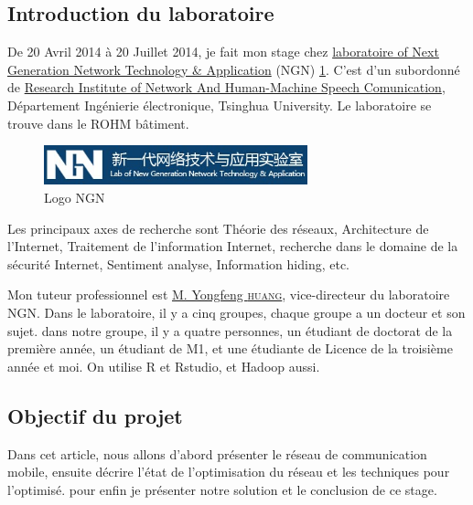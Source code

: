   \subsection{Introduction du laboratoire}
 De 20 Avril 2014 à 20 Juillet 2014, je fait mon stage chez \href{http://203.91.121.76/joomla/}{laboratoire of Next Generation Network Technology \& Application} \textsf{(NGN)} \ref{Logo NGN}. C'est d'un subordonné de \href{http://www.ee.tsinghua.edu.cn/publish/eeen/3776/index.html}{Research Institute of Network And Human-Machine Speech Comunication}, Département Ingénierie électronique, Tsinghua University. Le laboratoire se trouve dans le ROHM bâtiment.
  \begin{figure}[H]
      \centering
      \includegraphics[width=3in]{images/NGN.jpg}
      \caption{Logo NGN}
      \label{Logo NGN}
  \end{figure}
Les principaux axes de recherche sont Théorie des réseaux, Architecture de l'Internet, Traitement de l'information Internet, recherche dans le domaine de la sécurité Internet, Sentiment analyse, Information hiding, etc.

 Mon tuteur professionnel est \href{http://203.91.121.76/joomla/index.php/staff/teacher/83-huangyongfeng}{M. Yongfeng \textsc{huang}}, vice-directeur du laboratoire NGN. Dans le laboratoire, il y a cinq groupes, chaque groupe a un docteur et son sujet. dans notre groupe, il y a quatre personnes, un étudiant de doctorat de la première année, un étudiant de M1, et une étudiante de Licence de la troisième année et moi. On utilise R et Rstudio, et Hadoop aussi.
 
 \subsection{Objectif du projet}
Dans cet article, nous allons d'abord présenter le réseau de communication mobile, ensuite décrire l'état de l'optimisation du réseau et les techniques pour l'optimisé. pour enfin je présenter notre solution et le conclusion de ce stage.